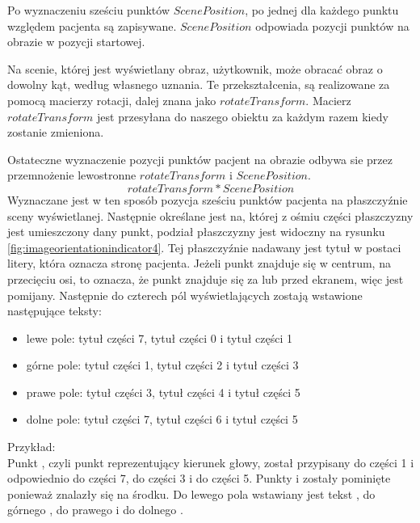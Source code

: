 Po wyznaczeniu sześciu punktów $ScenePosition$, po jednej dla każdego punktu względem pacjenta są zapisywane. $ScenePosition$ odpowiada pozycji punktów na obrazie w pozycji startowej.

Na scenie, której jest wyświetlany obraz, użytkownik, może obracać obraz o dowolny kąt, według własnego uznania.
Te przekształcenia, są realizowane za pomocą macierzy rotacji, dalej znana jako $rotateTransform$.
Macierz $rotateTransform$ jest przesyłana do naszego obiektu  za każdym razem kiedy zostanie zmieniona.

Ostateczne wyznaczenie pozycji punktów pacjent na obrazie odbywa sie przez przemnożenie lewostronne $rotateTransform$ i $ScenePosition$.
\[rotateTransform * ScenePosition\]
Wyznaczane jest w ten sposób pozycja sześciu punktów pacjenta na płaszczyźnie sceny wyświetlanej.
Następnie określane jest na, której z ośmiu części płaszczyzny jest umieszczony dany punkt, podział płaszczyzny jest widoczny na rysunku \ref{fig:imageorientationindicator4}.
Tej płaszczyźnie nadawany jest tytuł w postaci litery, która oznacza stronę pacjenta.
Jeżeli punkt znajduje się w centrum, na przecięciu osi, to oznacza, że punkt znajduje się za lub przed ekranem, więc jest pomijany.
Następnie do czterech pól wyświetlających zostają wstawione następujące teksty:
\begin{itemize}
    \item lewe pole: tytuł części 7, tytuł części 0 i tytuł części 1
    \item górne pole: tytuł części 1, tytuł części 2 i tytuł części 3
    \item prawe pole: tytuł części 3, tytuł części 4 i tytuł części 5
    \item dolne pole: tytuł części 7, tytuł części 6 i tytuł części 5
\end{itemize}

Przykład:\\
Punkt , czyli punkt reprezentujący kierunek głowy, został przypisany do części 1 i odpowiednio  do części 7,  do części 3 i  do części 5.
Punkty  i  zostały pominięte ponieważ znalazły się na środku.
Do lewego pola wstawiany jest tekst , do górnego , do prawego  i do dolnego .

